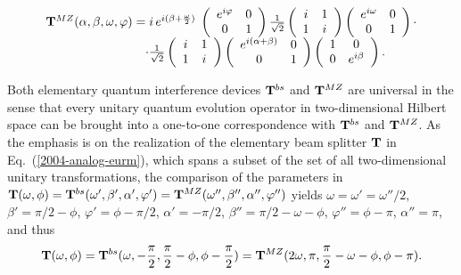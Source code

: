 \documentclass[12pt]{iopart}
\begin{document}
\begin{equation}
\begin{array}{l}
{\bf T}^{MZ} (\alpha ,\beta ,\omega ,\varphi )=
i \, e^{i(\beta +{\omega \over 2})}\;
\left(
\begin{array}{cc}
e^{i\varphi }& 0\\
0& 1
 \end{array}
\right)
{1\over \sqrt{2}}\left(
\begin{array}{cc}
i& 1\\
1& i
 \end{array}
\right)
\left(
\begin{array}{cc}
e^{i\omega}& 0\\
0&1
 \end{array}
\right)   \cdot \\  \qquad
\qquad
\qquad
\qquad  \cdot
{1\over \sqrt{2}}\left(
\begin{array}{cc}
i& 1\\
1& i
 \end{array}
\right)
\left(
\begin{array}{cc}
e^{i(\alpha+\beta )}& 0\\
0&1
 \end{array}
\right)
\left(
\begin{array}{cc}
1& 0\\
0& e^{i\beta}
 \end{array}
\right)
 .
 \end{array}
\label{e:quid2mm}
\end{equation}



Both elementary quantum interference devices
${\bf T}^{bs}$
and
${\bf T}^{MZ}$
are  universal in the
sense that
 every unitary quantum
evolution operator in two-dimensional Hilbert space can be brought into a
one-to-one correspondence with
${\bf T}^{bs}$
and
${\bf T}^{MZ}$.
As the emphasis is on the realization of the elementary beam splitter
${\bf T}$ in Eq.~(\ref{2004-analog-eurm}),
which spans a subset of the set of all two-dimensional unitary transformations,
the comparison of the parameters in
${\bf T}(\omega ,\phi )=
{\bf T}^{bs}(\omega ',\beta ',\alpha ',\varphi ')=
{\bf T}^{MZ}(\omega '',\beta '',\alpha '',\varphi '')$
yields
$\omega =\omega' =\omega''/2$,
$\beta'=\pi /2 -\phi$,
$\varphi'=\phi-\pi /2$,
$\alpha'=-\pi /2$,
$\beta''=\pi /2 - \omega -\phi$,
$\varphi''=\phi - \pi $,
$\alpha''=\pi $,
and thus
\begin{equation}
{\bf T} (\omega ,\phi ) =
{\bf T}^{bs} (\omega ,- {\pi \over 2 },{\pi \over 2} -\phi ,\phi-{\pi \over  2} ) =
{\bf T}^{MZ} (2\omega ,\pi  ,{\pi \over 2} - \omega -\phi ,\phi - \pi  )
.
\end{equation}
\end{document}

